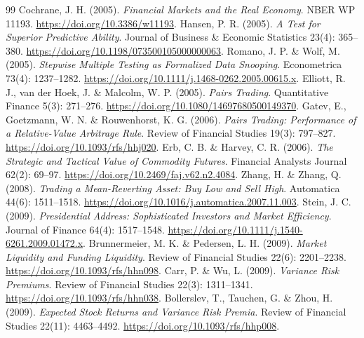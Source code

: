 \begin{thebibliography}{99}
 Cochrane, J. H. (2005). \emph{Financial Markets and the Real Economy}. NBER WP 11193. \href{https://doi.org/10.3386/w11193}{https://doi.org/10.3386/w11193}.
 Hansen, P. R. (2005). \emph{A Test for Superior Predictive Ability}. Journal of Business \& Economic Statistics 23(4): 365--380. \href{https://doi.org/10.1198/073500105000000063}{https://doi.org/10.1198/073500105000000063}.
 Romano, J. P. \& Wolf, M. (2005). \emph{Stepwise Multiple Testing as Formalized Data Snooping}. Econometrica 73(4): 1237--1282. \href{https://doi.org/10.1111/j.1468-0262.2005.00615.x}{https://doi.org/10.1111/j.1468-0262.2005.00615.x}.
 Elliott, R. J., van der Hoek, J. \& Malcolm, W. P. (2005). \emph{Pairs Trading}. Quantitative Finance 5(3): 271--276. \href{https://doi.org/10.1080/14697680500149370}{https://doi.org/10.1080/14697680500149370}.
 Gatev, E., Goetzmann, W. N. \& Rouwenhorst, K. G. (2006). \emph{Pairs Trading: Performance of a Relative-Value Arbitrage Rule}. Review of Financial Studies 19(3): 797--827. \href{https://doi.org/10.1093/rfs/hhj020}{https://doi.org/10.1093/rfs/hhj020}.
 Erb, C. B. \& Harvey, C. R. (2006). \emph{The Strategic and Tactical Value of Commodity Futures}. Financial Analysts Journal 62(2): 69--97. \href{https://doi.org/10.2469/faj.v62.n2.4084}{https://doi.org/10.2469/faj.v62.n2.4084}.
 Zhang, H. \& Zhang, Q. (2008). \emph{Trading a Mean-Reverting Asset: Buy Low and Sell High}. Automatica 44(6): 1511--1518. \href{https://doi.org/10.1016/j.automatica.2007.11.003}{https://doi.org/10.1016/j.automatica.2007.11.003}.
 Stein, J. C. (2009). \emph{Presidential Address: Sophisticated Investors and Market Efficiency}. Journal of Finance 64(4): 1517--1548. \href{https://doi.org/10.1111/j.1540-6261.2009.01472.x}{https://doi.org/10.1111/j.1540-6261.2009.01472.x}.
 Brunnermeier, M. K. \& Pedersen, L. H. (2009). \emph{Market Liquidity and Funding Liquidity}. Review of Financial Studies 22(6): 2201--2238. \href{https://doi.org/10.1093/rfs/hhn098}{https://doi.org/10.1093/rfs/hhn098}.
 Carr, P. \& Wu, L. (2009). \emph{Variance Risk Premiums}. Review of Financial Studies 22(3): 1311--1341. \href{https://doi.org/10.1093/rfs/hhn038}{https://doi.org/10.1093/rfs/hhn038}.
 Bollerslev, T., Tauchen, G. \& Zhou, H. (2009). \emph{Expected Stock Returns and Variance Risk Premia}. Review of Financial Studies 22(11): 4463--4492. \href{https://doi.org/10.1093/rfs/hhp008}{https://doi.org/10.1093/rfs/hhp008}.

\end{thebibliography}
